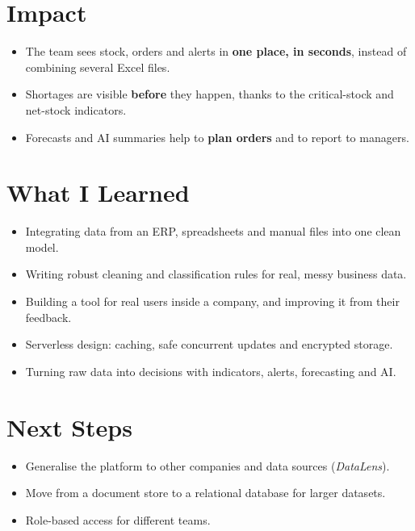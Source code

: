 \documentclass[a4paper,11pt]{article}
\begin{document}
\section{Impact}

\begin{itemize}
  \item The team sees stock, orders and alerts in \textbf{one place, in seconds}, instead of combining several Excel files.
  \item Shortages are visible \textbf{before} they happen, thanks to the critical-stock and net-stock indicators.
  \item Forecasts and AI summaries help to \textbf{plan orders} and to report to managers.
\end{itemize}

\section{What I Learned}

\begin{itemize}
  \item Integrating data from an ERP, spreadsheets and manual files into one clean model.
  \item Writing robust cleaning and classification rules for real, messy business data.
  \item Building a tool for real users inside a company, and improving it from their feedback.
  \item Serverless design: caching, safe concurrent updates and encrypted storage.
  \item Turning raw data into decisions with indicators, alerts, forecasting and AI.
\end{itemize}

\section{Next Steps}
\begin{itemize}
  \item Generalise the platform to other companies and data sources (\emph{DataLens}).
  \item Move from a document store to a relational database for larger datasets.
  \item Role-based access for different teams.
\end{itemize}
\end{document}
